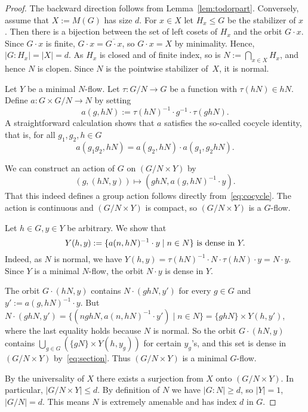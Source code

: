 \documentclass[12pt]{amsart}
\theoremstyle{plain}
\theoremstyle{definition}
\begin{document}
\begin{proof}
The backward direction follows from  Lemma~\ref{lem:todorpart}. Conversely, assume that  $X:=M(G)$ has size $d$.
For $x\in X$ let $H_x\leq G$ be the stabilizer of $x$.
Then there is a bijection between the set of left cosets of $H_x$ and the orbit $G\cdot x$. Since $G\cdot x$ is finite, 
$G\cdot x=\overline{G\cdot x}$, so $G\cdot x=X$ by minimality.
Hence, $|G:H_x|=|X|=d$.  As $H_x$ is closed and of finite index, so is 
$N:=\bigcap_{x\in X}H_x$, and hence $N$ is clopen.
Since $N$ is the pointwise stabilizer of~$X$, it is normal. 
 

Let $Y$ be a minimal $N$-flow. 
Let $\tau: G/N\rightarrow G$ be a function with $\tau(hN)\in hN$.
Define $a: G \times G/N \rightarrow N$ by setting
$$
a(g, hN):= \tau(hN)^{-1}\cdot g^{-1}\cdot \tau(ghN).
$$
A straightforward calculation shows that $a$ satisfies the so-called cocycle identity, that is, for all $g_1,g_2,h\in G$ 
\begin{equation}\label{eq:cocycle}
a(g_1 g_2, hN) = a(g_2, hN)\cdot a(g_1, g_2 hN). 
\end{equation}

We can construct an action of $G$ on $(G/N \times Y)$ by
$$
(g,(hN, y)) \mapsto (ghN, a(g, hN)^{-1}\cdot y).
$$
That this indeed defines a group action follows directly from~\eqref{eq:cocycle}.
The action is continuous and $(G/N \times Y)$ is compact, so $(G/N \times Y)$ is a $G$-flow.

Let $h\in G,y\in Y$ be arbitrary.
We show that
\begin{equation}\label{eq:section}
Y(h,y):=\{a(n, hN)^{-1}\cdot y\mid n\in N\}\textup{ is dense in } Y.
\end{equation}
Indeed, as $N$ is normal, we have $Y(h,y)=\tau(hN)^{-1} \cdot N \cdot \tau(hN) \cdot y = N\cdot y$. Since $Y$ is a minimal $N$-flow, the orbit $N\cdot y$ is dense in $Y$. 

The orbit $G\cdot (hN,y)$ contains $N\cdot (ghN,y')$ for every $g\in G$ and $y':=a(g, hN)^{-1}\cdot y$. But
$N\cdot (ghN,y')=\{(nghN, a(n, hN)^{-1}\cdot y')\mid n\in N\}=\{ghN\}\times Y(h,y')$, where the last equality 
holds because $N$ is normal. So the orbit $G\cdot (hN,y)$ contains $\bigcup_{g\in G}(\{gN\}\times Y(h,y_g))$ for certain $y_g$'s, 
and this set is dense in $(G/N\times Y)$ by~\eqref{eq:section}. Thus $(G/N\times Y)$ is a minimal $G$-flow.

By the universality of $X$ there exists a surjection from $X$ onto  $(G/N \times Y)$. 
In particular, $|G/N\times Y|\le d$. By definition  of $N$ we have $|G:N|\ge d$, 
so $|Y|=1$, $|G/N|=d$.
This means $N$ is extremely amenable and has index $d$ in $G$.
\end{proof}
\end{document}
